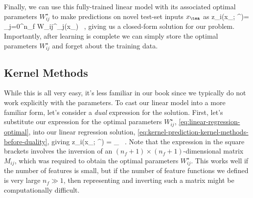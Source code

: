 Finally, we can use this fully-trained linear model with its associated optimal parameters $W^{\star}_{ij}$ to make predictions on novel test-set inputs $x_{\tea}$ as
\be\label{eq:kernel-prediction-kernel-methods-before-duality}
z_i\big(x_{\tea}; \theta^\star\big)=   \sum_{j=0}^{n_f} W_{ij}^\star \fea_j(x_{\tea}) \, , %
\ee
giving us a closed-form solution for our  problem. %
Importantly, after learning is complete we can simply store the optimal parameters $W^{\star}_{ij}$ and forget about the training data.





\subsection{Kernel Methods}\label{subsec:kernel-methods}


While this is all very easy, it's less familiar in our book since we typically do not work explicitly with the parameters. To cast our linear model into a more familiar form, let's consider a \emph{dual} expression for the solution. First, let's substitute our expression for the optimal parameters $W^{\star}_{ij}$, \eqref{eq:linear-regression-optimal}, into our linear regression solution, \eqref{eq:kernel-prediction-kernel-methods-before-duality}, giving
\be\label{eq:kernel-prediction-kernel-methods-before-duality-square}
z_i\big(x_{\tea}; \theta^\star\big) = \sum_{\tra\in \A} \le[\sum_{j,k=0}^{n_f}\fea_{j}(x_{\tea}) \le(M^{-1}\ri)_{jk}\fea_{k}(x_{\tra})\ri] \, .
\ee
Note that the expression in the square brackets involves the inversion of an $(n_f+1)\times(n_f+1)$-dimensional matrix $M_{ij}$, which was required to obtain the optimal parameters $W^{\star}_{ij}$. 
This works well if the number of features is small, but if the number of feature functions we defined is very large $n_f \gg 1$, then representing and inverting such a matrix might be computationally difficult.

